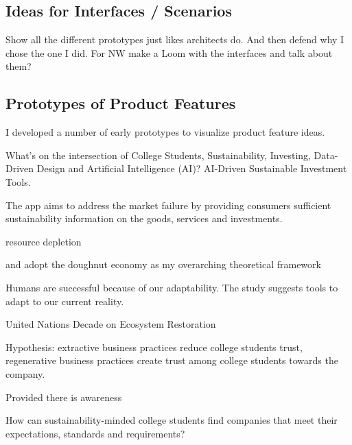 \documentclass[
  letterpaper,
  DIV=11,
  numbers=noendperiod]{scrartcl}
\begin{document}
\newpage

\subsection{Ideas for Interfaces /
Scenarios}\label{ideas-for-interfaces-scenarios}

Show all the different prototypes just likes architects do. And then
defend why I chose the one I did. For NW make a Loom with the interfaces
and talk about them?

\subsection{Prototypes of Product
Features}\label{prototypes-of-product-features}

I developed a number of early prototypes to visualize product feature
ideas.

What's on the intersection of College Students, Sustainability,
Investing, Data-Driven Design and Artificial Intelligence (AI)?
AI-Driven Sustainable Investment Tools.

The app aims to address the market failure by providing consumers
sufficient sustainability information on the goods, services and
investments.

resource depletion

and adopt the doughnut economy as my overarching theoretical framework

Humans are successful because of our adaptability. The study suggests
tools to adapt to our current reality.

United Nations Decade on Ecosystem Restoration

Hypothesis: extractive business practices reduce college students trust,
regenerative business practices create trust among college students
towards the company.

Provided there is awareness

How can sustainability-minded college students find companies that meet
their expectations, standards and requirements?
\end{document}
